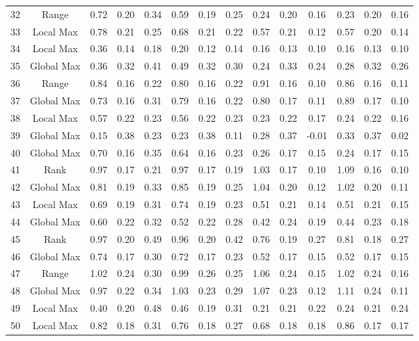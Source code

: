 \documentclass[11pt,a4paper]{article}
\begin{document}
\begin{table}[ht]
{\begin{tabular}{@{\extracolsep{4pt}}cccccccccccccc}
  32 & Range & 0.72 & 0.20 & 0.34 & 0.59 & 0.19 & 0.25 & 0.24 & 0.20 & 0.16 & 0.23 & 0.20 & 0.16 \\ 
  33 & Local Max & 0.78 & 0.21 & 0.25 & 0.68 & 0.21 & 0.22 & 0.57 & 0.21 & 0.12 & 0.57 & 0.20 & 0.14 \\ 
  34 & Local Max & 0.36 & 0.14 & 0.18 & 0.20 & 0.12 & 0.14 & 0.16 & 0.13 & 0.10 & 0.16 & 0.13 & 0.10 \\ 
  35 & Global Max & 0.36 & 0.32 & 0.41 & 0.49 & 0.32 & 0.30 & 0.24 & 0.33 & 0.24 & 0.28 & 0.32 & 0.26 \\ 
  36 & Range & 0.84 & 0.16 & 0.22 & 0.80 & 0.16 & 0.22 & 0.91 & 0.16 & 0.10 & 0.86 & 0.16 & 0.11 \\ 
  37 & Global Max & 0.73 & 0.16 & 0.31 & 0.79 & 0.16 & 0.22 & 0.80 & 0.17 & 0.11 & 0.89 & 0.17 & 0.10 \\ 
  38 & Local Max & 0.57 & 0.22 & 0.23 & 0.56 & 0.22 & 0.23 & 0.23 & 0.22 & 0.17 & 0.24 & 0.22 & 0.16 \\ 
  39 & Global Max & 0.15 & 0.38 & 0.23 & 0.23 & 0.38 & 0.11 & 0.28 & 0.37 & -0.01 & 0.33 & 0.37 & 0.02 \\ 
  40 & Global Max & 0.70 & 0.16 & 0.35 & 0.64 & 0.16 & 0.23 & 0.26 & 0.17 & 0.15 & 0.24 & 0.17 & 0.15 \\ 
  41 & Rank & 0.97 & 0.17 & 0.21 & 0.97 & 0.17 & 0.19 & 1.03 & 0.17 & 0.10 & 1.09 & 0.16 & 0.10 \\ 
  42 & Global Max & 0.81 & 0.19 & 0.33 & 0.85 & 0.19 & 0.25 & 1.04 & 0.20 & 0.12 & 1.02 & 0.20 & 0.11 \\ 
  43 & Local Max & 0.69 & 0.19 & 0.31 & 0.74 & 0.19 & 0.23 & 0.51 & 0.21 & 0.14 & 0.51 & 0.21 & 0.15 \\ 
  44 & Global Max & 0.60 & 0.22 & 0.32 & 0.52 & 0.22 & 0.28 & 0.42 & 0.24 & 0.19 & 0.44 & 0.23 & 0.18 \\ 
  45 & Rank & 0.97 & 0.20 & 0.49 & 0.96 & 0.20 & 0.42 & 0.76 & 0.19 & 0.27 & 0.81 & 0.18 & 0.27 \\ 
  46 & Global Max & 0.74 & 0.17 & 0.30 & 0.72 & 0.17 & 0.23 & 0.52 & 0.17 & 0.15 & 0.52 & 0.17 & 0.15 \\ 
  47 & Range & 1.02 & 0.24 & 0.30 & 0.99 & 0.26 & 0.25 & 1.06 & 0.24 & 0.15 & 1.02 & 0.24 & 0.16 \\ 
  48 & Global Max & 0.97 & 0.22 & 0.34 & 1.03 & 0.23 & 0.29 & 1.07 & 0.23 & 0.12 & 1.11 & 0.24 & 0.11 \\ 
  49 & Local Max & 0.40 & 0.20 & 0.48 & 0.46 & 0.19 & 0.31 & 0.21 & 0.21 & 0.22 & 0.24 & 0.21 & 0.24 \\ 
  50 & Local Max & 0.82 & 0.18 & 0.31 & 0.76 & 0.18 & 0.27 & 0.68 & 0.18 & 0.18 & 0.86 & 0.17 & 0.17 \\ 

 \hline

\end{tabular}
}
\end{table}
\end{document}
